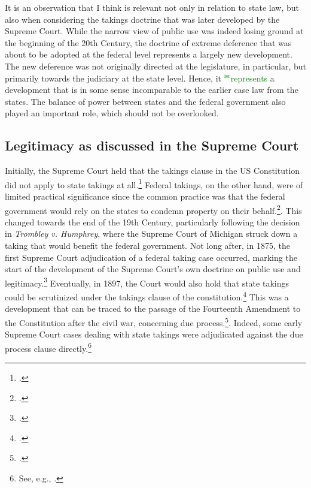 \documentclass[12pt,a4paper]{book} %
\newcommand{\isr}[1]{\textcolor{green}{$^{\textrm{isr}}${#1}}}
\begin{document}
It is an observation that I think is relevant not only in relation to state law, but also when considering the takings doctrine that was later developed by the Supreme Court. While the narrow view of public use was indeed losing ground at the beginning of the 20th Century, the doctrine of extreme deference that was about to be adopted at the federal level represents a largely new development. The new deference was not originally directed at the legislature, in particular, but primarily towards the judiciary at the state level. Hence, it \isr{represents} a development that is in some sense incomparable to the earlier case law from the states. The balance of power between states and the federal government also played an important role, which should not be overlooked.

\subsection{Legitimacy as discussed in the Supreme Court}\label{subsec:US}

Initially, the Supreme Court held that the takings clause in the US Constitution did not apply to state takings at all.\footcite{barron33} Federal takings, on the other hand, were of limited practical significance since the common practice was that the federal government would rely on the states to condemn property on their behalf.\footcite[30]{meidinger80}. This changed towards the end of the 19th Century, particularly following the decision in {\it Trombley v. Humphrey}, where the Supreme Court of Michigan struck down a taking that would benefit the federal government.\cite{trombley71} Not long after, in 1875, the first Supreme Court adjudication of a federal taking case occurred, marking the start of the development of the Supreme Court's own doctrine on public use and legitimacy.\footcite{kohl75} Eventually, in 1897, the Court would also hold that state takings could be scrutinized under the takings clause of the constitution.\footcite{chicago97} This was a development that can be traced to the passage of the Fourteenth Amendment to the Constitution after the civil war, concerning due process.\footcite{johnson11}. Indeed, some early Supreme Court cases dealing with state takings were adjudicated against the due process clause directly.\footnote{See, e.g., \cite{head85}.}
\end{document}
